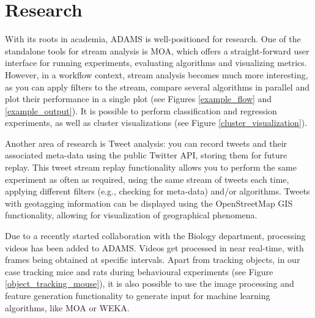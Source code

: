\documentclass[wcp]{jmlr}
\begin{document}
\section{Research}
With its roots in academia, ADAMS is well-positioned for research. One of the standalone tools for stream analysis is MOA, which offers a straight-forward user interface for running experiments, evaluating algorithms and visualizing metrics. However, in a workflow context, stream analysis becomes much more interesting, as you can apply filters to the stream, compare several algorithms in parallel and plot their performance in a single plot (see Figures \ref{example_flow} and \ref{example_output}). It is possible to perform classification and regression experiments, as well as cluster visualizations (see Figure \ref{cluster_visualization}).

Another area of research is Tweet analysis: you can record tweets and their associated meta-data using the public Twitter API, storing them for future replay. This tweet stream replay functionality allows you to perform the same experiment as often as required, using the same stream of tweets each time, applying different filters (e.g., checking for meta-data) and/or algorithms. Tweets with geotagging information can be displayed using the OpenStreetMap GIS functionality, allowing for visualization of geographical phenomena.

Due to a recently started collaboration with the Biology department, processing videos has been added to ADAMS. Videos get processed in near real-time, with frames being obtained at specific intervals. Apart from tracking objects, in our case tracking mice and rats during behavioural experiments (see Figure \ref{object_tracking_mouse}), it is also possible to use the image processing and feature generation functionality to generate input for machine learning algorithms, like MOA or WEKA.
\end{document}
